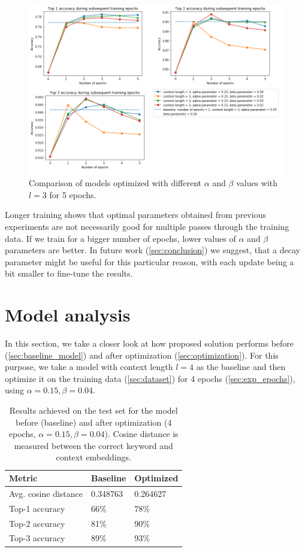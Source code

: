 \documentclass{llncs}
\begin{document}
\begin{figure}
    \centering
    \caption{Comparison of models optimized with different \(\alpha\) and \(\beta\) values with \(l=3\) for 5 epochs.}
    \label{fig:exp4_2_epochs_comparison}
    \includegraphics[scale=0.65]{res/exp4_epoch_multiconfiguration_top_acc.png}
\end{figure}

Longer training shows that optimal parameters obtained from previous experiments are not necessarily good for multiple passes through the training data.
If we train for a bigger number of epochs, lower values of \(\alpha\) and \(\beta\) parameters are better.
In future work (\ref{sec:conclusion}) we suggest, that a decay parameter might be useful for this particular reason, with each update being a bit smaller to fine-tune the results.


\section{Model analysis}
\label{sec:model_analysis}
In this section, we take a closer look at how proposed solution performs before (\ref{sec:baseline_model}) and after optimization (\ref{sec:optimization}).
For this purpose, we take a model with context length \(l=4\) as the baseline and then optimize it on the training data (\ref{sec:dataset}) for 4 epochs (\ref{sec:exp_epochs}), using \(\alpha=0.15, \beta=0.04\).

\begin{table}
\centering
\begin{tabular}{ | m{3cm} | m{2cm} | m{2cm} |}
    \hline
    \textbf{Metric} & \textbf{Baseline} & \textbf{Optimized} \\
    \hline
    Avg. cosine distance & 0.348763 & 0.264627 \\
    \hline
    Top-1 accuracy & 66\% & 78\% \\
    \hline
    Top-2 accuracy & 81\% & 90\% \\
    \hline
    Top-3 accuracy & 89\% & 93\% \\
    \hline
\end{tabular}
\caption{Results achieved on the test set for the model before (baseline) and after optimization (4 epochs, \(\alpha=0.15, \beta=0.04\)). Cosine distance is measured between the correct keyword and context embeddings.}
\label{table:model_analysis}
\end{table}
\end{document}
